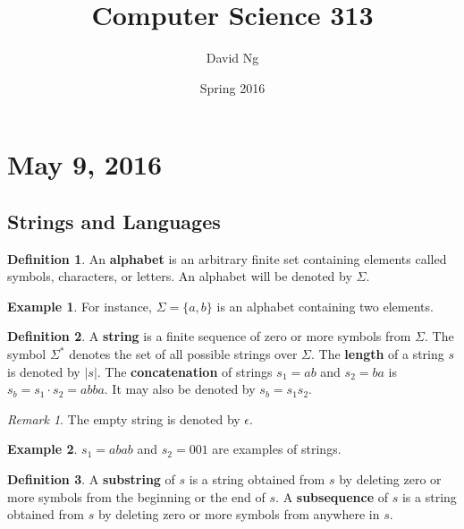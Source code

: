 \documentclass[11pt]{article}
\theoremstyle{plain} %
\theoremstyle{definition}
\newtheorem*{definition}{Definition} %
\theoremstyle{example}
\newtheorem*{example}{Example}
\theoremstyle{remark}
\newtheorem*{remark}{Remark}
\begin{document}
\title{Computer Science 313}
\author{David Ng}
\date{Spring 2016}
\maketitle

\tableofcontents

\eject

\section{May 9, 2016} 
\subsection{Strings and Languages}

\begin{definition}
An \textbf{alphabet} is an arbitrary finite set containing elements called symbols, characters, or letters. An alphabet will be denoted by $\Sigma$. 
\end{definition}

\begin{example}
For instance, $\Sigma = \{a, b\}$ is an alphabet containing two elements. 
\end{example}

\begin{definition}
A \textbf{string} is a finite sequence of zero or more symbols from $\Sigma$. The symbol $\Sigma^*$ denotes the set of all possible strings over $\Sigma$. The \textbf{length} of a string $s$ is denoted by $|s|$. The \textbf{concatenation} of strings $s_1 = ab$ and $s_2 = ba$ is $s_b= s_1 \cdot s_2 = abba$. It may also be denoted by $s_b = s_1s_2$. 

\end{definition}

\begin{remark}
The empty string is denoted by $\epsilon$. 
\end{remark}

\begin{example}
$s_1 = abab$ and $s_2 = 001$ are examples of strings.
\end{example}

\begin{definition}
A \textbf{substring} of $s$ is a string obtained from $s$ by deleting zero or more symbols from the beginning or the end of $s$. 
A \textbf{subsequence} of $s$ is a string obtained from $s$ by deleting zero or more symbols from anywhere in $s$. 
\end{definition}
\end{document}
